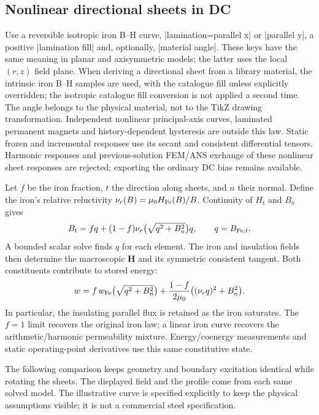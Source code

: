 \subsection{Nonlinear directional sheets in DC}
Use a reversible isotropic iron B--H curve, |lamination=parallel x| or
|parallel y|, a positive |lamination fill| and, optionally, |material angle|.
These keys have the same meaning in planar and axisymmetric models; the latter
uses the local $(r,z)$ field plane. When deriving a directional sheet from a library
material, the intrinsic iron B--H samples are used, with the catalogue fill
unless explicitly overridden; the isotropic catalogue fill conversion is not
applied a second time. The angle belongs to the physical material,
not to the TikZ drawing transformation. Independent nonlinear principal-axis
curves, laminated permanent magnets and history-dependent hysteresis are outside
this law. Static frozen and incremental responses use its secant and consistent
differential tensors. Harmonic responses and previous-solution FEM/ANS exchange of these nonlinear
sheet responses are rejected; exporting the ordinary DC bias remains available.

Let $f$ be the iron fraction, $t$ the direction along sheets, and $n$ their
normal. Define the iron's relative reluctivity
$\nu_r(B)=\mu_0 H_{\rm Fe}(B)/B$. Continuity of $H_t$ and $B_n$ gives
\[
 B_t=fq+(1-f)\nu_r\bigl(\sqrt{q^2+B_n^2}\bigr)q,
 \qquad q=B_{{\rm Fe},t}.
\]
A bounded scalar solve finds $q$ for each element. The iron and insulation
fields then determine the macroscopic $\mathbf H$ and its symmetric consistent
tangent. Both constituents contribute to stored energy:
\[
 w=f\,w_{\rm Fe}\bigl(\sqrt{q^2+B_n^2}\bigr)
   +\frac{1-f}{2\mu_0}\bigl((\nu_rq)^2+B_n^2\bigr).
\]
In particular, the insulating parallel flux is retained as the iron saturates.
The $f=1$ limit recovers the original iron law; a linear iron curve recovers
the arithmetic/harmonic permeability mixture. Energy/coenergy measurements and
static operating-point derivatives use this same constitutive state.

The following comparison keeps geometry and boundary excitation identical while
rotating the sheets. The displayed field and the profile come from each same
solved model. The illustrative curve is specified explicitly to keep the
physical assumptions visible; it is not a commercial steel specification.

\begin{codeexample}
\end{codeexample}

